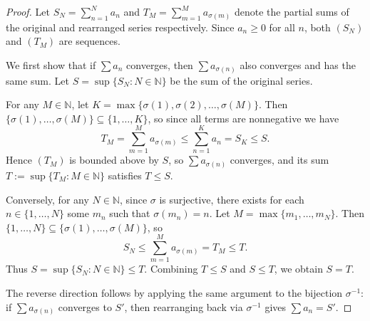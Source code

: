 \begin{proof}
    Let $S_N = \sum_{n=1}^N a_n$ and $T_M = \sum_{m=1}^M a_{\sigma(m)}$ denote the partial sums of the original and rearranged series respectively. Since $a_n \geq 0$ for all $n$, both $(S_N)$ and $(T_M)$ are  sequences.

    We first show that if $\sum a_n$ converges, then $\sum a_{\sigma(n)}$ also converges and has the same sum. Let $S = \sup\{S_N : N \in \mathbb{N}\}$ be the sum of the original series.

    For any $M \in \mathbb{N}$, let $K = \max\{\sigma(1), \sigma(2), \dots, \sigma(M)\}$. Then $\{\sigma(1), \dots, \sigma(M)\} \subseteq \{1, \dots, K\}$, so since all terms are nonnegative we have
    $$T_M = \sum_{m=1}^M a_{\sigma(m)} \leq \sum_{n=1}^K a_n = S_K \leq S.$$
    Hence $(T_M)$ is bounded above by $S$, so $\sum a_{\sigma(n)}$ converges, and its sum $T := \sup\{T_M : M \in \mathbb{N}\}$ satisfies $T \leq S$.


    Conversely, for any $N \in \mathbb{N}$, since $\sigma$ is surjective, there exists for each $n \in \{1, \dots, N\}$ some $m_n$ such that $\sigma(m_n) = n$. Let $M = \max\{m_1, \dots, m_N\}$. Then $\{1, \dots, N\} \subseteq \{\sigma(1), \dots, \sigma(M)\}$, so
    $$S_N \leq \sum_{m=1}^M a_{\sigma(m)} = T_M \leq T.$$
    Thus $S = \sup\{S_N : N \in \mathbb{N}\} \leq T$. Combining $T \leq S$ and $S \leq T$, we obtain $S = T$.

    The reverse direction follows by applying the same argument to the bijection $\sigma^{-1}$: if $\sum a_{\sigma(n)}$ converges to $S'$, then rearranging back via $\sigma^{-1}$ gives $\sum a_n = S'$.
\end{proof}
